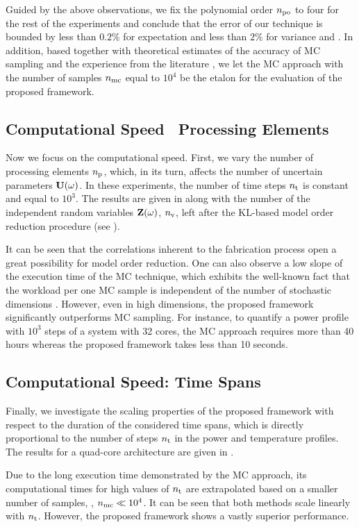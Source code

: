 Guided by the above observations, we fix the polynomial order ${n_\text{po}}$ to four for the rest of the experiments and conclude that the error of our technique is bounded by less than $0.2\%$ for expectation and less than $2\%$ for variance and \pdf.
In addition, based  together with theoretical estimates of the accuracy of MC sampling \cite{diaz-emparanza2002} and the experience from the literature \cite{xiu2010, maitre2010, shen2009, eldred2008}, we let the MC approach with the number of samples ${n_\text{mc}}$ equal to $10^4$ be the etalon for the evaluation of the proposed framework.

\subsection{Computational Speed \versus\ Processing Elements}
Now we focus on the computational speed.
First, we vary the number of processing elements ${n_\text{p}}$, which, in its turn, affects the number of uncertain parameters $\mathbf{U}(\omega)$.
In these experiments, the number of time steps ${n_\text{t}}$ is constant and equal to $10^3$.
The results are given in  along with the number of the independent random variables $\mathbf{Z}(\omega)$, ${n_\text{v}}$, left after the KL-based model order reduction procedure (see ).


It can be seen that the correlations inherent to the fabrication process \cite{cheng2011} open a great possibility for model order reduction.
One can also observe a low slope of the execution time of the MC technique, which exhibits the well-known fact that the workload per one MC sample is independent of the number of stochastic dimensions \cite{maitre2010}.
However, even in high dimensions, the proposed framework significantly outperforms MC sampling. For instance, to quantify a power profile with $10^3$ steps of a system with 32 cores, the MC approach requires more than 40 hours whereas the proposed framework takes less than 10 seconds.

\subsection{Computational Speed: Time Spans}
Finally, we investigate the scaling properties of the proposed framework with respect to the duration of the considered time spans, which is directly proportional to the number of steps ${n_\text{t}}$ in the power and temperature profiles.
The results for a quad-core architecture are given in .


Due to the long execution time demonstrated by the MC approach, its computational times for high values of ${n_\text{t}}$ are extrapolated based on a smaller number of samples, \ie, ${n_\text{mc}} \ll 10^4$.
It can be seen that both methods scale linearly with ${n_\text{t}}$. However, the proposed framework shows a vastly superior performance.
